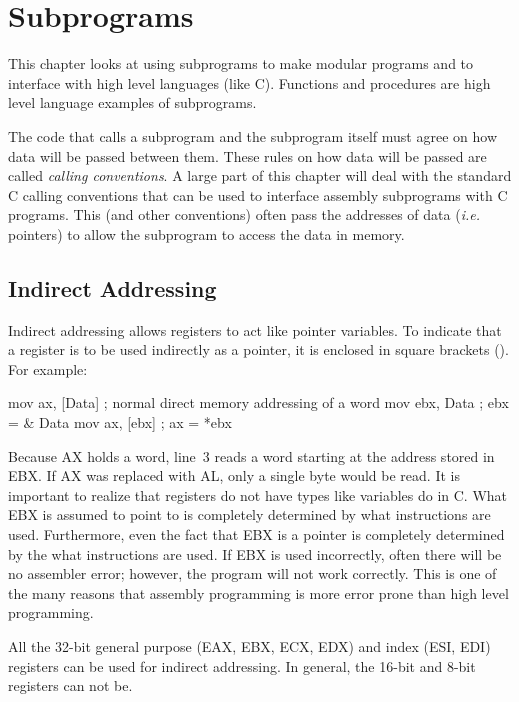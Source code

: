 \chapter{Subprograms}

This chapter looks at using subprograms to make modular programs and to
interface with high level languages (like C). Functions and procedures are
high level language examples of subprograms.

The code that calls a subprogram and the subprogram itself must agree
on how data will be passed between them. These rules on how data will
be passed are called \emph{calling conventions}.  A large part of this chapter will deal with the standard C
calling conventions that can be used to interface assembly subprograms
with C programs. This (and other conventions) often pass the addresses
of data (\emph{i.e.} pointers) to allow the subprogram to access the
data in memory.

\section{Indirect Addressing}

Indirect addressing allows registers to act like pointer variables. To
indicate that a register is to be used indirectly as a pointer, it is
enclosed in square brackets ({\code []}). For example:
\begin{AsmCodeListing}[frame=none]
      mov    ax, [Data]     ; normal direct memory addressing of a word
      mov    ebx, Data      ; ebx = & Data
      mov    ax, [ebx]      ; ax = *ebx
\end{AsmCodeListing}
Because AX holds a word, line~3 reads a word starting at the address stored 
in EBX. If AX was replaced with AL, only a single byte would be read. It is
important to realize that registers do not have types like variables do in
C. What EBX is assumed to point to is completely determined by what
instructions are used. Furthermore, even the fact that EBX is a pointer is
completely determined by the what instructions are used. If EBX is used
incorrectly, often there will be no assembler error; however, the program
will not work correctly. This is one of the many reasons that assembly
programming is more error prone than high level programming.

All the 32-bit general purpose (EAX, EBX, ECX, EDX) and index (ESI, EDI)
registers can be used for indirect addressing. In general, the 16-bit 
and 8-bit registers can not be.

